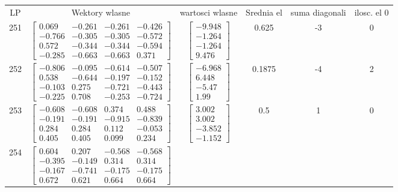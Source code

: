 \documentclass[a4paper,12pt]{article}
\begin{document}
\bgroup {} \vspace{0.2in} \begin{tabular}{c c c c c c}
LP &Wektory wlasne & wartosci wlasne & Srednia el & suma diagonali & ilosc. el 0\\
251
&
$\begin{bmatrix} 0.069 & -0.261 & -0.261 & -0.426 \\ -0.766 & -0.305 & -0.305 & -0.572 \\ 0.572 & -0.344 & -0.344 & -0.594 \\ -0.285 & -0.663 & -0.663 & 0.371 \end{bmatrix}$
&
$\begin{bmatrix} -9.948 \\ -1.264 \\ -1.264 \\ 9.476 \end{bmatrix}$
&
0.625
&
-3
&
0
\\
252
&
$\begin{bmatrix} -0.806 & -0.095 & -0.614 & -0.507 \\ 0.538 & -0.644 & -0.197 & -0.152 \\ -0.103 & 0.275 & -0.721 & -0.443 \\ -0.225 & 0.708 & -0.253 & -0.724 \end{bmatrix}$
&
$\begin{bmatrix} -6.968 \\ 6.448 \\ -5.47 \\ 1.99 \end{bmatrix}$
&
0.1875
&
-4
&
2
\\
253
&
$\begin{bmatrix} -0.608 & -0.608 & 0.374 & 0.488 \\ -0.191 & -0.191 & -0.915 & -0.839 \\ 0.284 & 0.284 & 0.112 & -0.053 \\ 0.405 & 0.405 & 0.099 & 0.234 \end{bmatrix}$
&
$\begin{bmatrix} 3.002 \\ 3.002 \\ -3.852 \\ -1.152 \end{bmatrix}$
&
0.5
&
1
&
0
\\
254
&
$\begin{bmatrix} 0.604 & 0.207 & -0.568 & -0.568 \\ -0.395 & -0.149 & 0.314 & 0.314 \\ -0.167 & -0.741 & -0.175 & -0.175 \\ 0.672 & 0.621 & 0.664 & 0.664 \end{bmatrix}$

\end{tabular}
\end{document}
